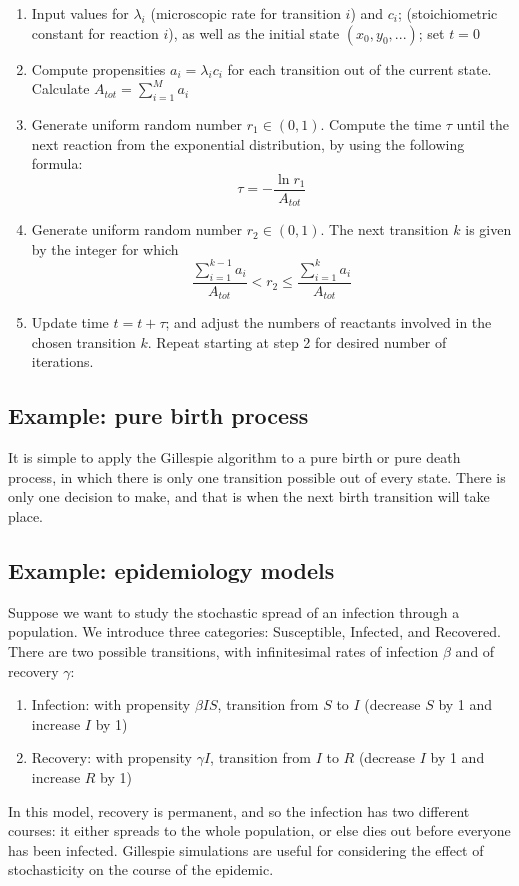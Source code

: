 \documentclass[11pt]{book}
\begin{document}
\begin{enumerate}
\item Input values for $\lambda_i$ (microscopic rate for transition $i$) and $c_i$; (stoichiometric constant for reaction $i$), as well as the initial state
$(x_0, y_0, ...)$; set $t =0$ \\
\item  Compute propensities $a_i = \lambda_i c_i $ for each transition out of the current state. Calculate $A_{tot} = \sum_{i=1}^M a_i$\\
\item Generate uniform random number $r_1 \in (0,1)$. Compute the time $\tau$ until the next reaction from the exponential distribution, by using the following formula: 
$$\tau =  - \frac{\ln r_1}{A_{tot}}$$
\item  Generate uniform random number  $r_2 \in (0,1)$. The next transition $k$ is given by the integer for which
$$ \frac{\sum_{i=1} ^{k-1} a_i}{A_{tot}}  <   r_2  \leq  \frac{\sum_{i=1} ^k a_i}{A_{tot}}$$
\item  Update time $t = t + \tau$; and adjust the numbers of reactants involved in the chosen transition $k$. Repeat starting at step 2 for desired number of iterations.
\end{enumerate}

\subsection{Example: pure birth process}
It is simple to apply the Gillespie algorithm to a pure birth or pure death process, in which there is only one transition possible out of every state. There is only one decision
to make, and that is when the next birth transition will take place. 

\subsection{Example: epidemiology models}
Suppose we want to study the stochastic spread of an infection through a population. We introduce three categories: Susceptible, Infected, and Recovered. There are two possible transitions, with infinitesimal rates of infection $\beta$ and of recovery $\gamma$:
\begin{enumerate}
\item Infection: with propensity $\beta I S$, transition from $S$ to $I$ (decrease $S$ by 1 and increase $I$ by 1)
\item Recovery: with propensity $\gamma I$, transition from $I$ to $R$ (decrease $I$ by 1 and increase $R$ by 1)
\end{enumerate}
In this model, recovery is permanent, and so the infection has two different courses: it either spreads to the whole population, or else dies out before everyone has been infected. Gillespie simulations are useful for considering the effect of stochasticity on the course of the epidemic.
\end{document}
